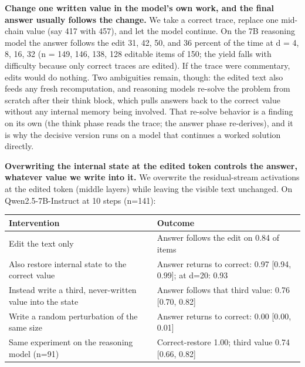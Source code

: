 \textbf{Change one written value in the model's own work, and the final
answer usually follows the change.} We take a correct trace, replace one
mid-chain value (say 417 with 457), and let the model continue. On the
7B reasoning model the answer follows the edit 31, 42, 50, and 36
percent of the time at d = 4, 8, 16, 32 (n = 149, 146, 138, 128 editable
items of 150; the yield falls with difficulty because only correct
traces are edited). If the trace were commentary, edits would do
nothing. Two ambiguities remain, though: the edited text also feeds any
fresh recomputation, and reasoning models re-solve the problem from
scratch after their think block, which pulls answers back to the correct
value without any internal memory being involved. That re-solve behavior
is a finding on its own (the think phase reads the trace; the answer
phase re-derives), and it is why the decisive version runs on a model
that continues a worked solution directly.

\textbf{Overwriting the internal state at the edited token controls the
answer, whatever value we write into it.} We overwrite the
residual-stream activations at the edited token (middle layers) while
leaving the visible text unchanged. On Qwen2.5-7B-Instruct at 10 steps
(n=141):

\begin{table}[t]\centering\small
\begin{tabular}{ll}
\toprule
Intervention & Outcome \\
\midrule



Edit the text only & Answer follows the edit on 0.84 of items \\
Also restore internal state to the correct value & Answer returns to
correct: 0.97 {[}0.94, 0.99{]}; at d=20: 0.93 \\
Instead write a third, never-written value into the state & Answer
follows that third value: 0.76 {[}0.70, 0.82{]} \\
Write a random perturbation of the same size & Answer returns to
correct: 0.00 {[}0.00, 0.01{]} \\
Same experiment on the reasoning model (n=91) & Correct-restore 1.00;
third value 0.74 {[}0.66, 0.82{]} \\
\bottomrule
\end{tabular}
\end{table}

